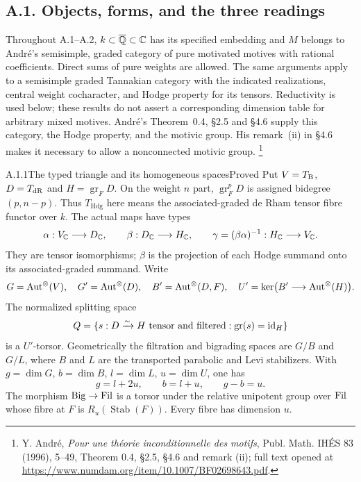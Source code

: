 \subsection{A.1. Objects, forms, and the three readings}

Throughout A.1--A.2, $k\subset\overline{\mathbb Q}\subset\mathbb C$ has its specified
embedding and $M$ belongs to Andr\'e's semisimple, graded category of pure
motivated motives with rational coefficients. Direct sums of pure weights are
allowed. The same arguments apply to a semisimple graded Tannakian category
with the indicated realizations, central weight cocharacter, and Hodge
property for its tensors. Reductivity is used below; these results do not
assert a corresponding dimension table for arbitrary mixed motives.
Andr\'e's Theorem~0.4, \S2.5 and \S4.6 supply this category, the Hodge
property, and the motivic group. His remark~(ii) in \S4.6 makes it necessary
to allow a nonconnected motivic group.
\footnote{Y. Andr\'e, \emph{Pour une th\'eorie inconditionnelle des motifs},
Publ. Math. IH\'ES 83 (1996), 5--49, Theorem 0.4, \S2.5, \S4.6 and
remark (ii); full text opened at
\url{https://www.numdam.org/item/10.1007/BF02698643.pdf}.}

\begin{result}{A.1.1}{The typed triangle and its homogeneous spaces}{Proved}
Put $V=T_{\mathrm B}$, $D=T_{\mathrm{dR}}$ and $H=\operatorname{gr}_F D$. On the weight
$n$ part, $\operatorname{gr}^p_F D$ is assigned bidegree $(p,n-p)$.
Thus $T_{\mathrm{Hdg}}$ here means the associated-graded de Rham tensor
fibre functor over $k$. The actual maps have types
\[
 \alpha:V_{\mathbb C}\longrightarrow D_{\mathbb C},\qquad
 \beta:D_{\mathbb C}\longrightarrow H_{\mathbb C},\qquad
 \gamma=(\beta\alpha)^{-1}:H_{\mathbb C}\longrightarrow V_{\mathbb C}.
\]
They are tensor isomorphisms; $\beta$ is the projection of each Hodge
summand onto its associated-graded summand. Write
\[
 G=\operatorname{Aut}^\otimes(V),\quad G'=\operatorname{Aut}^\otimes(D),\quad
 B'=\operatorname{Aut}^\otimes(D,F),\quad
 U'=\ker\bigl(B'\longrightarrow\operatorname{Aut}^\otimes(H)\bigr).
\]
The normalized splitting space
\[
 Q=\{s:D\xrightarrow{\sim}H\text{ tensor and filtered}:
                        \operatorname{gr}(s)=\operatorname{id}_H\}
\]
is a $U'$-torsor. Geometrically the filtration and bigrading spaces are
$G/B$ and $G/L$, where $B$ and $L$ are the transported parabolic and Levi
stabilizers. With $g=\dim G$, $b=\dim B$, $l=\dim L$, $u=\dim U$, one has
\[
                 g=l+2u,\qquad b=l+u,\qquad g-b=u.
\]
The morphism $\mathrm{Big}\to\mathrm{Fil}$ is a torsor under the relative unipotent
group over $\mathrm{Fil}$ whose fibre at $F$ is $R_u(\operatorname{Stab}(F))$.
Every fibre has dimension $u$.
\end{result}

